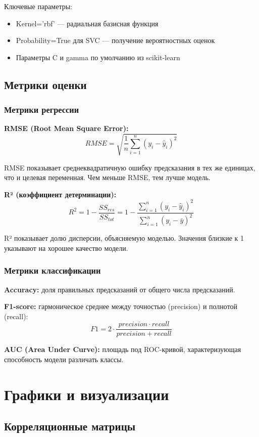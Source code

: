 \documentclass[a4paper]{article}
\begin{document}
Ключевые параметры:
\begin{itemize}
    \item Kernel='rbf' — радиальная базисная функция
    \item Probability=True для SVC — получение вероятностных оценок
    \item Параметры C и gamma по умолчанию из scikit-learn
\end{itemize}

\subsection{Метрики оценки}

\subsubsection{Метрики регрессии}
\textbf{RMSE (Root Mean Square Error):}
$$RMSE = \sqrt{\frac{1}{n}\sum_{i=1}^{n}(y_i - \hat{y}_i)^2}$$

RMSE показывает среднеквадратичную ошибку предсказания в тех же единицах, что и целевая переменная. Чем меньше RMSE, тем лучше модель.

\textbf{R² (коэффициент детерминации):}
$$R^2 = 1 - \frac{SS_{res}}{SS_{tot}} = 1 - \frac{\sum_{i=1}^{n}(y_i - \hat{y}_i)^2}{\sum_{i=1}^{n}(y_i - \bar{y})^2}$$

R² показывает долю дисперсии, объясняемую моделью. Значения близкие к 1 указывают на хорошее качество модели.

\subsubsection{Метрики классификации}
\textbf{Accuracy:} доля правильных предсказаний от общего числа предсказаний.

\textbf{F1-score:} гармоническое среднее между точностью (precision) и полнотой (recall):
$$F1 = 2 \cdot \frac{precision \cdot recall}{precision + recall}$$

\textbf{AUC (Area Under Curve):} площадь под ROC-кривой, характеризующая способность модели различать классы.

\section{Графики и визуализации}

\subsection{Корреляционные матрицы}
\end{document}
